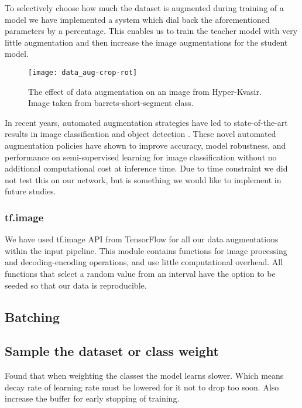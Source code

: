 \documentclass[thesis.tex]{subfiles}
\begin{document}
To selectively choose how much the dataset is augmented during training of a model we have implemented a system which dial back the aforementioned parameters by a percentage. This enables us to train the teacher model with very little augmentation and then increase the image augmentations for the student model.

\begin{figure} %
  \begin{center}
    \texttt{[image: data\_aug-crop-rot]}
    \caption[The effect of data augmentation on sample images.]{The effect of data augmentation on an image from Hyper-Kvasir. Image taken from barrets-short-segment class.}
    \label{fig:data_aug-crop-rot}
  \end{center}
\end{figure}

In recent years, automated augmentation strategies have led to state-of-the-art results in image classification and object detection \cite{AutoAugmentLearning19, RandAugmentPractical19}. These novel automated augmentation policies have shown to improve accuracy, model robustness, and performance on semi-supervised learning for image classification without no additional computational cost at inference time. Due to time constraint we did not test this on our network, but is something we would like to implement in future studies.



\subsubsection{tf.image}
We have used tf.image API from TensorFlow for all our data augmentations within the input pipeline. This module contains functions for image processing and decoding-encoding operations, and use little computational overhead. All functions that select a random value from an interval have the option to be seeded so that our data is reproducible.


\subsection{Batching}



\subsection{Sample the dataset or class weight}
Found that when weighting the classes the model learns slower. Which means decay rate of learning rate must be lowered for it not to drop too soon. Also increase the buffer for early stopping of training.
\end{document}
